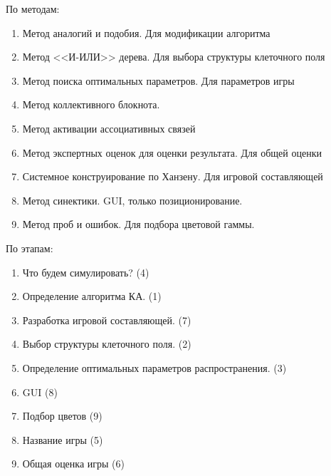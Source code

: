 \documentclass[12pt,a4paper]{report}
\begin{document}
По методам:
\begin{enumerate}
\item Метод аналогий и подобия. Для модификации алгоритма
\item Метод <<И-ИЛИ>> дерева. Для выбора структуры клеточного поля
\item Метод поиска оптимальных параметров. Для параметров игры
\item Метод коллективного блокнота. 
\item Метод активации ассоциативных связей
\item Метод экспертных оценок для оценки результата. Для общей оценки
\item Системное конструирование по Ханзену. Для игровой составляющей
\item Метод синектики. GUI, только позиционирование.
\item Метод проб и ошибок. Для подбора цветовой гаммы.
\end{enumerate}

По этапам:
\begin{enumerate}
\item Что будем симулировать? (4)
\item Определение алгоритма КА. (1)
\item Разработка игровой составляющей. (7)
\item Выбор структуры клеточного поля. (2)
\item Определение оптимальных параметров распространения. (3)
\item GUI (8)
\item Подбор цветов (9)
\item Название игры (5)
\item Общая оценка игры (6)
\end{enumerate}
\end{document}
